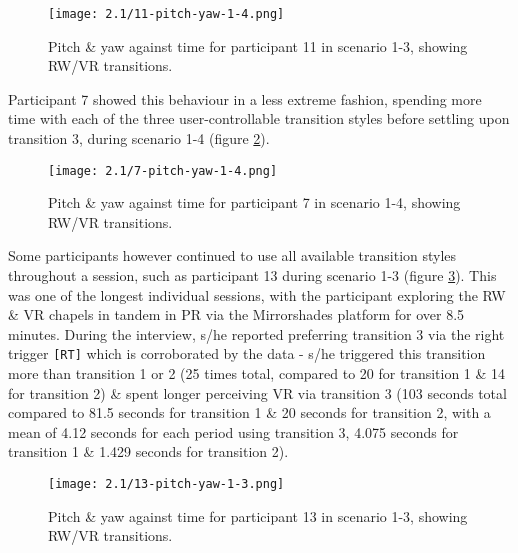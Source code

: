 \begin{figure}[h]
	\begin{center}
	\texttt{[image: 2.1/11-pitch-yaw-1-4.png]}
	\caption{Pitch \& yaw against time for participant 11 in scenario 1-3, showing RW/VR transitions.}
	\label{11-pitch-yaw-1-4.png}
	\end{center}
\end{figure}

Participant 7 showed this behaviour in a less extreme fashion, spending more time with each of the three user-controllable transition styles before settling upon transition 3, during scenario 1-4 (figure \ref{7-pitch-yaw-1-4.png}).

\begin{figure}[h]
	\begin{center}
	\texttt{[image: 2.1/7-pitch-yaw-1-4.png]}
	\caption{Pitch \& yaw against time for participant 7 in scenario 1-4, showing RW/VR transitions.}
	\label{7-pitch-yaw-1-4.png}
	\end{center}
\end{figure}

Some participants however continued to use all available transition styles throughout a session, such as participant 13 during scenario 1-3 (figure \ref{13-pitch-yaw-1-3.png}). This was one of the longest individual sessions, with the participant exploring the RW \& VR chapels in tandem in PR via the Mirrorshades platform for over 8.5 minutes. During the interview, s/he reported preferring transition 3 via the right trigger \texttt{[RT]} which is corroborated by the data - s/he triggered this transition more than transition 1 or 2 (25 times total, compared to 20 for transition 1 \& 14 for transition 2) \& spent longer perceiving VR via transition 3 (103 seconds total compared to 81.5 seconds for transition 1 \& 20 seconds for transition 2, with a mean of 4.12 seconds for each period using transition 3, 4.075 seconds for transition 1 \& 1.429 seconds for transition 2).

\begin{figure}[h]
	\begin{center}
	\texttt{[image: 2.1/13-pitch-yaw-1-3.png]}
	\caption{Pitch \& yaw against time for participant 13 in scenario 1-3, showing RW/VR transitions.}
	\label{13-pitch-yaw-1-3.png}
	\end{center}
\end{figure}


